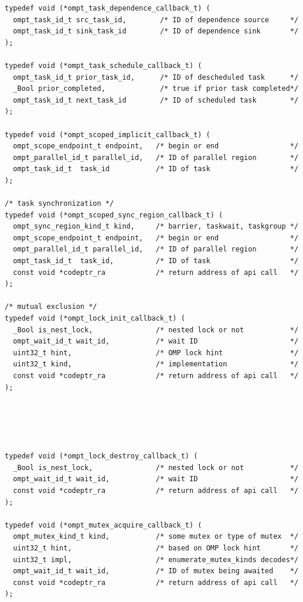 \documentclass{article}
\begin{document}
{\begin{verbatim}
typedef void (*ompt_task_dependence_callback_t) (
  ompt_task_id_t src_task_id,        /* ID of dependence source     */
  ompt_task_id_t sink_task_id        /* ID of dependence sink       */
);

typedef void (*ompt_task_schedule_callback_t) (
  ompt_task_id_t prior_task_id,      /* ID of descheduled task      */
  _Bool prior_completed,             /* true if prior task completed*/
  ompt_task_id_t next_task_id        /* ID of scheduled task        */
);

typedef void (*ompt_scoped_implicit_callback_t) ( 
  ompt_scope_endpoint_t endpoint,   /* begin or end                 */
  ompt_parallel_id_t parallel_id,   /* ID of parallel region        */
  ompt_task_id_t  task_id           /* ID of task                   */
);

/* task synchronization */
typedef void (*ompt_scoped_sync_region_callback_t) ( 
  ompt_sync_region_kind_t kind,     /* barrier, taskwait, taskgroup */
  ompt_scope_endpoint_t endpoint,   /* begin or end                 */ 
  ompt_parallel_id_t parallel_id,   /* ID of parallel region        */
  ompt_task_id_t  task_id,          /* ID of task                   */
  const void *codeptr_ra            /* return address of api call   */
);

/* mutual exclusion */
typedef void (*ompt_lock_init_callback_t) (
  _Bool is_nest_lock,               /* nested lock or not           */
  ompt_wait_id_t wait_id,           /* wait ID                      */
  uint32_t hint,                    /* OMP lock hint                */
  uint32_t kind,                    /* implementation               */
  const void *codeptr_ra            /* return address of api call   */
);





typedef void (*ompt_lock_destroy_callback_t) (
  _Bool is_nest_lock,               /* nested lock or not           */
  ompt_wait_id_t wait_id,           /* wait ID                      */
  const void *codeptr_ra            /* return address of api call   */
);

typedef void (*ompt_mutex_acquire_callback_t) ( 
  ompt_mutex_kind_t kind,           /* some mutex or type of mutex  */
  uint32_t hint,                    /* based on OMP lock hint       */
  uint32_t impl,                    /* enumerate_mutex_kinds decodes*/
  ompt_wait_id_t wait_id,           /* ID of mutex being awaited    */
  const void *codeptr_ra            /* return address of api call   */          
);


\end{verbatim}}
\end{document}
